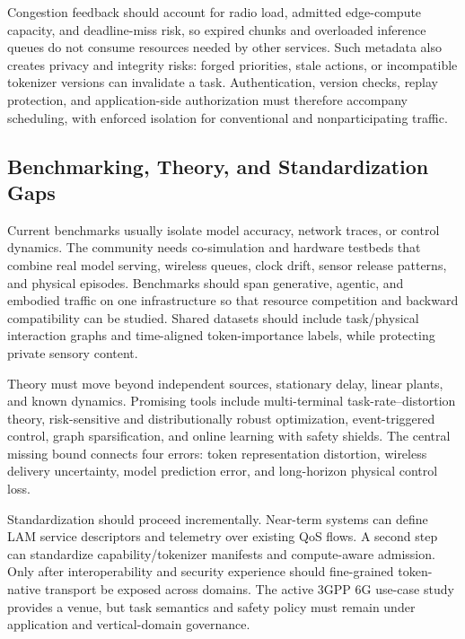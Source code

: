 \documentclass[letterpaper,journal]{IEEEtran}
\begin{document}
Congestion feedback should account for radio load, admitted edge-compute
capacity, and deadline-miss risk, so expired chunks and overloaded inference
queues do not consume resources needed by other services. Such metadata also
creates privacy and integrity risks: forged priorities, stale actions, or
incompatible tokenizer versions can invalidate a task. Authentication,
version checks, replay protection, and application-side authorization must
therefore accompany scheduling, with enforced isolation for conventional and
nonparticipating traffic.

\subsection{Benchmarking, Theory, and Standardization Gaps}
Current benchmarks usually isolate model accuracy, network traces, or control
dynamics. The community needs co-simulation and hardware testbeds that combine
real model serving, wireless queues, clock drift, sensor release patterns, and
physical episodes. Benchmarks should span generative, agentic, and embodied
traffic on one infrastructure so that resource competition and backward
compatibility can be studied. Shared datasets should include task/physical
interaction graphs and time-aligned token-importance labels, while protecting
private sensory content.

Theory must move beyond independent sources, stationary delay, linear plants,
and known dynamics. Promising tools include multi-terminal
task-rate--distortion theory, risk-sensitive and distributionally robust
optimization, event-triggered control, graph sparsification, and online
learning with safety shields. The central missing bound connects four errors:
token representation distortion, wireless delivery uncertainty, model
prediction error, and long-horizon physical control loss.

Standardization should proceed incrementally. Near-term systems can define
LAM service descriptors and telemetry over existing QoS flows. A second step
can standardize capability/tokenizer manifests and compute-aware admission.
Only after interoperability and security experience should fine-grained
token-native transport be exposed across domains. The active 3GPP 6G use-case
study \cite{3gpp22870} provides a venue, but task semantics and safety policy
must remain under application and vertical-domain governance.
\end{document}

